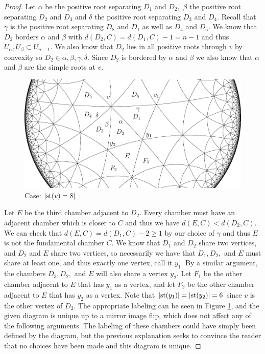 \documentclass[class=book, crop=false]{standalone}
\begin{document}
\begin{proof}
	Let $\alpha$ be the positive root separating $D_1$ and $D_2,$ $\beta$ the positive root separating $D_2$ and $D_3$ and $\delta$ the positive root separating $D_3$ and $D_4.$ Recall that $\gamma$ is the positive root separating $D_8$ and $D_1$ as well as $D_4$ and $D_5.$ We know that $D_2$ borders $\alpha$ and $\beta$ with $d(D_2,C)=d(D_1,C)-1=n-1$ and thus $U_\alpha,U_\beta\subset U_{n-1}.$ We also know that $D_2$ lies in all positive roots through $v$ by convexity so $D_2\in \alpha,\beta,\gamma,\delta.$ Since $D_2$ is bordered by $\alpha$ and $\beta$ we also know that $\alpha$ and $\beta$ are the simple roots at $v.$
	\begin{figure}[h]
		\label{deg8433f2}
	\begin{center}
		\includegraphics{diagrams/deg8433f2.pdf}
	\end{center}
	\caption{Case: $|\mathrm{st}(v)=8|$}
\end{figure}

Let $E$ be the third chamber adjacent to $D_2.$ Every chamber must have an adjacent chamber which is closer to $C$ and thus we have $d(E,C)<d(D_2,C).$ We can check that $d(E,C)=d(D_1,C)-2\ge 1$ by our choice of $\gamma$ and thus $E$ is not the fundamental chamber $C.$ We know that $D_1$ and $D_2$ share two vertices, and $D_2$ and $E$ share two vertices, so necessarily we have that $D_1,D_2,$ and $E$ must share at least one, and thus exactly one vertex, call it $y_1.$ By a similar argument, the chambers $D_3,D_2,$ and $E$ will also share a vertex $y_2.$ Let $F_1$ be the other chamber adjacent to $E$ that has $y_1$ as a vertex, and let $F_2$ be the other chamber adjacent to $E$ that has $y_2$ as a vertex. Note that $|\mathrm{st}(y_1)|=|\mathrm{st}(y_2)|=6$ since $v$ is the other vertex of $D_2.$ The appropriate labeling can be seen in Figure \ref{deg8433f2}, and the given diagram is unique up to a mirror image flip, which does not affect any of the following arguments. The labeling of these chambers could have simply been defined by the diagram, but the previous explanation seeks to convince the reader that no choices have been made and this diagram is unique.


\end{proof}
\end{document}
